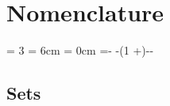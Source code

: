 \section*{Nomenclature}
\newcount\totalcol
\totalcol = 3
\newdimen\cola
\cola = 6cm
\newdimen\colb
\colb = 0cm
\newdimen\colc
\colc =\dimexpr\textwidth -\tabcolsep * -\arrayrulewidth * (1 +\totalcol)-\cola -\colb\relax
\subsection*{Sets}
\vspace{-1em}
